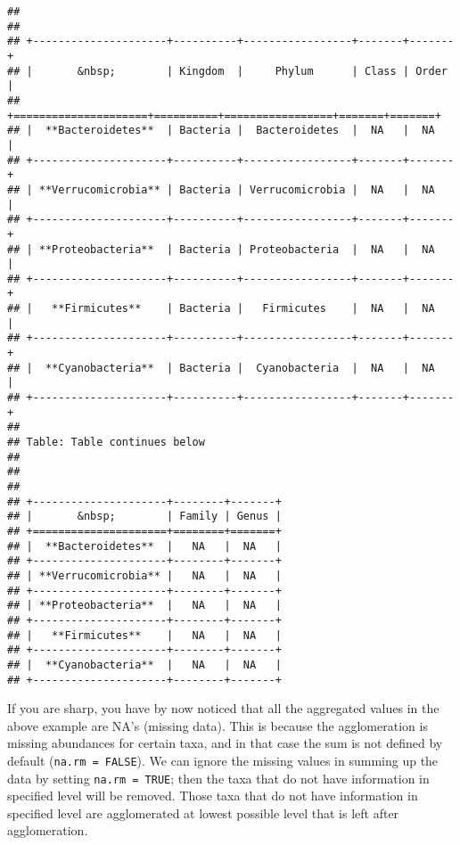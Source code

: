 \documentclass[
  oneside]{book}
\newenvironment{Shaded}{\begin{snugshade}}{\end{snugshade}}
\newcommand{\CommentTok}[1]{\textcolor[rgb]{0.56,0.35,0.01}{\textit{#1}}}
\newcommand{\DataTypeTok}[1]{\textcolor[rgb]{0.13,0.29,0.53}{#1}}
\newcommand{\KeywordTok}[1]{\textcolor[rgb]{0.13,0.29,0.53}{\textbf{#1}}}
\newcommand{\NormalTok}[1]{#1}
\newcommand{\OperatorTok}[1]{\textcolor[rgb]{0.81,0.36,0.00}{\textbf{#1}}}
\newcommand{\StringTok}[1]{\textcolor[rgb]{0.31,0.60,0.02}{#1}}
\begin{document}
\begin{verbatim}
## 
## 
## +---------------------+----------+-----------------+-------+-------+
## |       &nbsp;        | Kingdom  |     Phylum      | Class | Order |
## +=====================+==========+=================+=======+=======+
## |  **Bacteroidetes**  | Bacteria |  Bacteroidetes  |  NA   |  NA   |
## +---------------------+----------+-----------------+-------+-------+
## | **Verrucomicrobia** | Bacteria | Verrucomicrobia |  NA   |  NA   |
## +---------------------+----------+-----------------+-------+-------+
## | **Proteobacteria**  | Bacteria | Proteobacteria  |  NA   |  NA   |
## +---------------------+----------+-----------------+-------+-------+
## |   **Firmicutes**    | Bacteria |   Firmicutes    |  NA   |  NA   |
## +---------------------+----------+-----------------+-------+-------+
## |  **Cyanobacteria**  | Bacteria |  Cyanobacteria  |  NA   |  NA   |
## +---------------------+----------+-----------------+-------+-------+
## 
## Table: Table continues below
## 
##  
## 
## +---------------------+--------+-------+
## |       &nbsp;        | Family | Genus |
## +=====================+========+=======+
## |  **Bacteroidetes**  |   NA   |  NA   |
## +---------------------+--------+-------+
## | **Verrucomicrobia** |   NA   |  NA   |
## +---------------------+--------+-------+
## | **Proteobacteria**  |   NA   |  NA   |
## +---------------------+--------+-------+
## |   **Firmicutes**    |   NA   |  NA   |
## +---------------------+--------+-------+
## |  **Cyanobacteria**  |   NA   |  NA   |
## +---------------------+--------+-------+
\end{verbatim}

If you are sharp, you have by now noticed that all the aggregated
values in the above example are NA's (missing data). This is because
the agglomeration is missing abundances for certain taxa, and in that
case the sum is not defined by default (\texttt{na.rm\ =\ FALSE}). We can
ignore the missing values in summing up the data by setting \texttt{na.rm\ =\ TRUE}; then the taxa that do not have information in specified level
will be removed. Those taxa that do not have information in specified
level are agglomerated at lowest possible level that is left after
agglomeration.

\begin{Shaded}
\end{Shaded}
\end{document}
